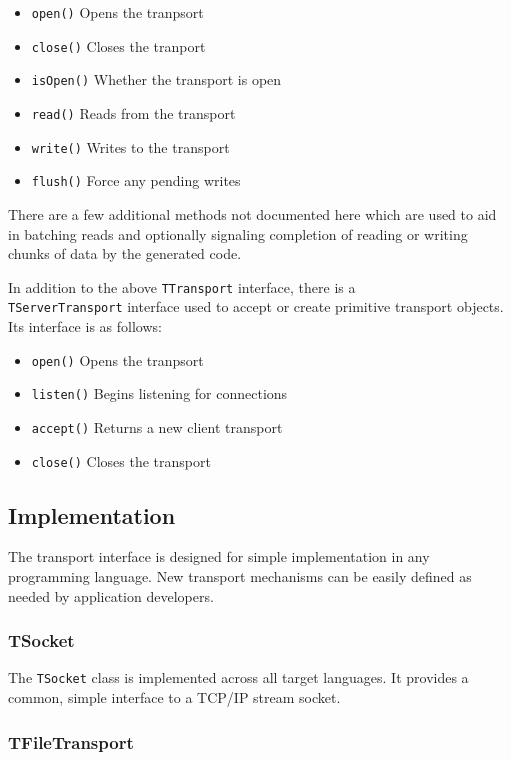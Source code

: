 \documentclass[nocopyrightspace,blockstyle]{sigplanconf}
\begin{document}
\begin{itemize}
\item \texttt{open()} Opens the tranpsort
\item \texttt{close()} Closes the tranport
\item \texttt{isOpen()} Whether the transport is open
\item \texttt{read()} Reads from the transport
\item \texttt{write()} Writes to the transport
\item \texttt{flush()} Force any pending writes
\end{itemize}

There are a few additional methods not documented here which are used to aid
in batching reads and optionally signaling completion of reading or writing
chunks of data by the generated code.

In addition to the above
\texttt{TTransport} interface, there is a\\
\texttt{TServerTransport} interface
used to accept or create primitive transport objects. Its interface is as
follows:

\begin{itemize}
\item \texttt{open()} Opens the tranpsort
\item \texttt{listen()} Begins listening for connections
\item \texttt{accept()} Returns a new client transport
\item \texttt{close()} Closes the transport

\end{itemize}

\subsection{Implementation}

The transport interface is designed for simple implementation in any
programming language. New transport mechanisms can be easily defined as needed
by application developers.

\subsubsection{TSocket}

The \texttt{TSocket} class is implemented across all target languages. It
provides a common, simple interface to a TCP/IP stream socket.

\subsubsection{TFileTransport}
\end{document}
